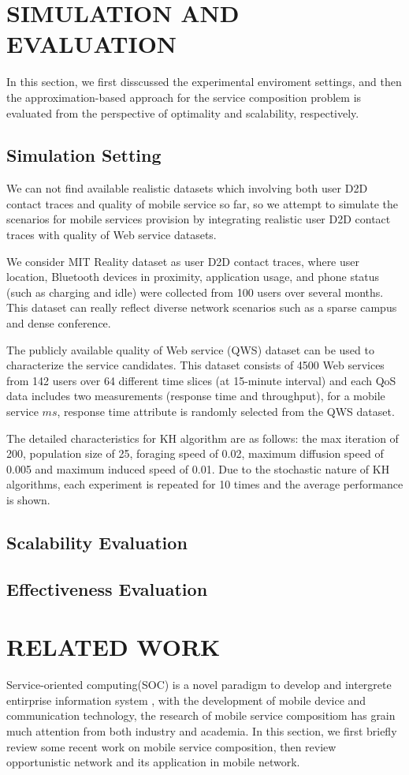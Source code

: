 \documentclass[10pt,journal,compsoc]{IEEEtran}
\begin{document}
\section{SIMULATION AND EVALUATION}
In this section, we first disscussed the experimental enviroment settings, and then the approximation-based approach for the service composition problem is evaluated from the perspective of optimality and scalability, respectively.
\subsection{Simulation Setting}
We can not find available realistic datasets which involving both user D2D contact traces and quality of mobile service so far, so we attempt to simulate the scenarios for mobile services provision by integrating realistic user D2D contact traces with quality of Web service datasets. 

We consider MIT Reality dataset as user D2D contact traces, where user location, Bluetooth devices in proximity, application usage, and phone status (such as charging and idle) were collected from 100 users over several months. This dataset can really reflect diverse network scenarios such as a sparse campus and dense conference.

The publicly available quality of Web service (QWS) dataset\cite{zheng2014investigating} can be used to characterize the service candidates. This dataset consists of 4500 Web services from 142 users over 64 different time slices (at 15-minute interval) and each QoS data includes two measurements (response time and throughput), for a mobile service $ms$, response time attribute is randomly selected from the QWS dataset. 

The detailed characteristics for KH algorithm are as follows: the max iteration of 200, population size of 25, foraging speed of 0.02, maximum diffusion speed of 0.005 and maximum induced speed of 0.01. Due to the stochastic nature of KH algorithms, each experiment is repeated for 10 times and the average performance is shown.

\subsection{Scalability Evaluation}
\subsection{Effectiveness Evaluation}

\section{RELATED WORK}
Service-oriented computing(SOC) is a novel paradigm to develop and intergrete entirprise information system \cite{}, with the development of mobile device and communication technology, the research of mobile service compositiom has grain much attention from both industry and academia. In this section, we first briefly review some recent work on mobile service composition, then review opportunistic network and its application in mobile network.
\end{document}
